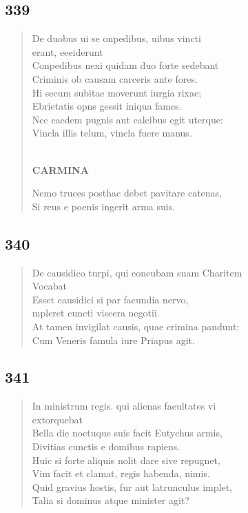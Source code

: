 \documentclass[11pt, a4paper]{report}
\begin{document}
            \subsection*{339}
      \begin{verse}
      De duobus ui se onpedibus, uibus vincti \\ erant, eeeiderunt \\ Conpedibus nexi quidam duo forte sedebant \\ Criminis ob causam carceris ante fores. \\ Hi secum subitae moverunt iurgia rixae; \\ Ebrietatis opns gessit iniqua fames. \\ Nec caedem pugnis aut calcibus egit uterque: \\ Vincla illis telum, vincla fuere manus. \\ 
        ﻿\pagebreak 
    \begin{center} \textbf{CARMINA} \end{center}Nemo truces posthac debet pavitare catenas, \\ Si reus e poenis ingerit arma suis. \\ 
      \end{verse}
  
            \subsection*{340}
      \begin{verse}
      De causidico turpi, qui eoneubam suam Charitem \\ Vocabat \\ Esset causidici si par facundia nervo, \\ mpleret cuncti viscera negotii. \\ At tamen invigilat causis, quae crimina pandunt: \\ Cum Veneris famula iure Priapus agit. \\ 
      \end{verse}
  
            \subsection*{341}
      \begin{verse}
      In ministrum regis. qui alienas faeultates vi \\ extorquebat \\ Bella die noctuque suis facit Eutychus armis, \\ Divitias cunctis e domibus rapiens. \\ Huic si forte aliquis nolit dare sive repugnet, \\ Vim facit et clamat, regis habenda, nimis. \\ Quid gravius hostis, fur aut latrunculus implet, \\ Talia si dominus atque minister agit? \\ 
      \end{verse}
  
\end{document}
